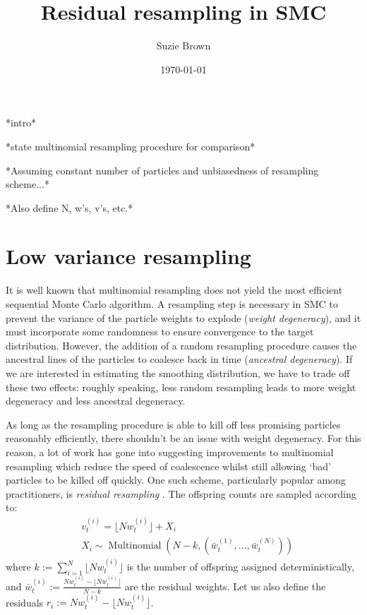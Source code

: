 \documentclass[fleqn]{article}
\title{Residual resampling in SMC}
\author{Suzie Brown}
\date{\today}
\newcommand{\Mn}{\operatorname{Multinomial}}
\newcommand{\vt}[2][t]{v_{#1}^{(#2)}}
\newcommand{\wt}[2][t]{w_{#1}^{(#2)}}
\newcommand{\wbar}[2][t]{\bar{w}_{#1}^{(#2)}}
\begin{document}
\maketitle
\thispagestyle{fancy}

*intro*

*state multinomial resampling procedure for comparison*

*Assuming constant number of particles and unbiasedness of resampling scheme...*

*Also define N, w's, v's, etc.*\\

\section{Low variance resampling}

It is well known that multinomial resampling does not yield the most efficient  sequential Monte Carlo algorithm.
A resampling step is necessary in SMC to prevent the variance of the particle weights to explode (\emph{weight degeneracy}), and it must incorporate some randomness to ensure convergence to the target distribution.
However, the addition of a random resampling procedure causes the ancestral lines of the particles to coalesce back in time (\emph{ancestral degeneracy}).
If we are interested in estimating the smoothing distribution, we have to trade off these two effects: roughly speaking, less random resampling leads to more weight degeneracy and less ancestral degeneracy.

As long as the resampling procedure is able to kill off less promising particles reasonably efficiently, there shouldn't be an issue with weight degeneracy.
For this reason, a lot of work has gone into suggesting improvements to multinomial resampling which reduce the speed of coalescence whilst still allowing `bad' particles to be killed off quickly.
One such scheme, particularly popular among practitioners, is \emph{residual resampling} \citep{liu1998}. The offspring counts are sampled according to:
\begin{align*}
& \vt{i} = \lfloor N \wt{i} \rfloor + X_i \\
& X_i \sim \Mn (N-k, (\wbar{1}, \dots, \wbar{N}))
\end{align*}
where $k := \sum_{i=1}^N \lfloor N \wt{i} \rfloor$ is the number of offspring assigned deterministically, and $\wbar{i} := \frac{N\wt{i} - \lfloor N \wt{i} \rfloor}{N - k}$ are the residual weights. Let us also define the residuals $r_i := N\wt{i} - \lfloor N \wt{i} \rfloor$.
\end{document}
